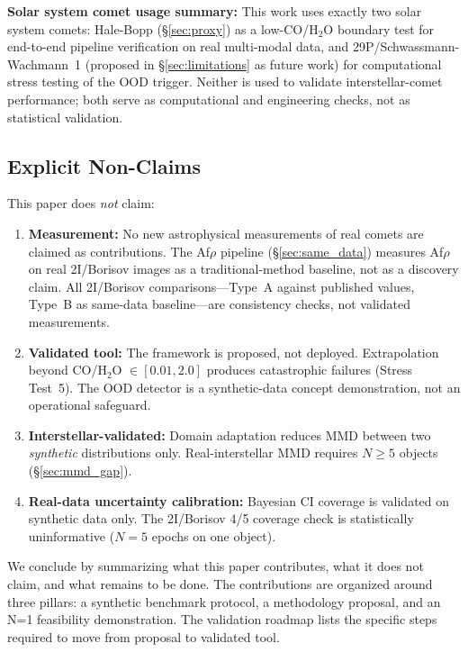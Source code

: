 \documentclass[usenatbib]{mnras}
\begin{document}
\textbf{Solar system comet usage summary:} This work uses exactly two solar system comets: Hale-Bopp (\S\ref{sec:proxy}) as a low-CO/H$_2$O boundary test for end-to-end pipeline verification on real multi-modal data, and 29P/Schwassmann-Wachmann~1 (proposed in \S\ref{sec:limitations} as future work) for computational stress testing of the OOD trigger. Neither is used to validate interstellar-comet performance; both serve as computational and engineering checks, not as statistical validation.

\subsection{Explicit Non-Claims}\label{sec:non_claims}

This paper does \textit{not} claim:

\begin{enumerate}
    \item \textbf{Measurement:} No new astrophysical measurements of real comets are claimed as contributions. The Af$\rho$ pipeline (\S\ref{sec:same_data}) measures Af$\rho$ on real 2I/Borisov images as a traditional-method baseline, not as a discovery claim. All 2I/Borisov comparisons---Type~A against published values, Type~B as same-data baseline---are consistency checks, not validated measurements.
    \item \textbf{Validated tool:} The framework is proposed, not deployed. Extrapolation beyond CO/H$_2$O $\in [0.01, 2.0]$ produces catastrophic failures (Stress Test~5). The OOD detector is a synthetic-data concept demonstration, not an operational safeguard.
    \item \textbf{Interstellar-validated:} Domain adaptation reduces MMD between two \textit{synthetic} distributions only. Real-interstellar MMD requires $N \geq 5$ objects (\S\ref{sec:mmd_gap}).
    \item \textbf{Real-data uncertainty calibration:} Bayesian CI coverage is validated on synthetic data only. The 2I/Borisov 4/5 coverage check is statistically uninformative ($N=5$ epochs on one object).
\end{enumerate}

We conclude by summarizing what this paper contributes, what it does not claim, and what remains to be done. The contributions are organized around three pillars: a synthetic benchmark protocol, a methodology proposal, and an N=1 feasibility demonstration. The validation roadmap lists the specific steps required to move from proposal to validated tool.
\end{document}
